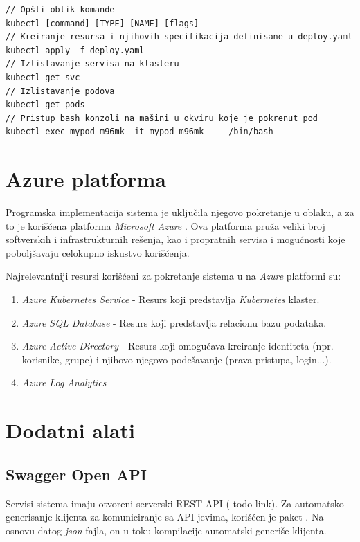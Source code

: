 \documentclass[12pt,oneside]{memoir}
\begin{document}
\begin{verbatim}
// Opšti oblik komande
kubectl [command] [TYPE] [NAME] [flags]
// Kreiranje resursa i njihovih specifikacija definisane u deploy.yaml
kubectl apply -f deploy.yaml
// Izlistavanje servisa na klasteru
kubectl get svc
// Izlistavanje podova
kubectl get pods
// Pristup bash konzoli na mašini u okviru koje je pokrenut pod
kubectl exec mypod-m96mk -it mypod-m96mk  -- /bin/bash
\end{verbatim}

\section{Azure platforma}

Programska implementacija sistema je uključila njegovo pokretanje u oblaku, a za to je korišćena platforma \emph{Microsoft Azure} \cite{Azure}. Ova platforma pruža veliki broj softverskih i infrastrukturnih rešenja, kao i propratnih servisa i mogućnosti koje poboljšavaju celokupno iskustvo korišćenja.

Najrelevantniji resursi korišćeni za pokretanje sistema u na \emph{Azure} platformi su:
\begin{enumerate}
\item \emph{Azure Kubernetes Service} \cite{AKS} - Resurs koji predstavlja \emph{Kubernetes} klaster.
\item \emph{Azure SQL Database} \cite{AzureSQLDB} - Resurs koji predstavlja relacionu bazu podataka.
\item \emph{Azure Active Directory} \cite{AAD} - Resurs koji omogućava kreiranje identiteta (npr. korisnike, grupe) i njihovo njegovo podešavanje (prava pristupa, login...).
\item \emph{Azure Log Analytics}
\end{enumerate}

\section{Dodatni alati}

\subsection{Swagger Open API}
Servisi sistema imaju otvoreni serverski REST API ( todo link). Za automatsko generisanje klijenta za komuniciranje sa API-jevima, korišćen je paket .
\cite{Swagger}
Na osnovu datog \emph{json} fajla, on u toku kompilacije automatski generiše klijenta.
\end{document}
